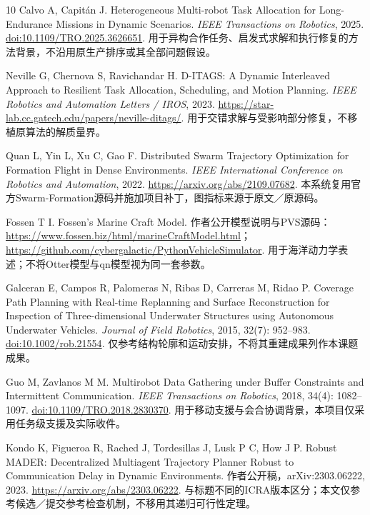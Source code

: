 \documentclass[UTF8,fontset=fandol,a4paper,11pt]{ctexart}
\begin{document}
\begingroup
\linespread{1.02}\selectfont
\setlength{\parskip}{0pt}
\begin{thebibliography}{10}
\small
\setlength{\itemsep}{3pt}
Calvo A, Capitán J.
Heterogeneous Multi-robot Task Allocation for Long-Endurance Missions in Dynamic Scenarios.
\textit{IEEE Transactions on Robotics}, 2025.
\href{https://doi.org/10.1109/TRO.2025.3626651}{doi:10.1109/TRO.2025.3626651}.
用于异构合作任务、启发式求解和执行修复的方法背景，不沿用原生产排序或其全部问题假设。

Neville G, Chernova S, Ravichandar H.
D-ITAGS: A Dynamic Interleaved Approach to Resilient Task Allocation, Scheduling, and Motion Planning.
\textit{IEEE Robotics and Automation Letters / IROS}, 2023.
\url{https://star-lab.cc.gatech.edu/papers/neville-ditags/}.
用于交错求解与受影响部分修复，不移植原算法的解质量界。

Quan L, Yin L, Xu C, Gao F.
Distributed Swarm Trajectory Optimization for Formation Flight in Dense Environments.
\textit{IEEE International Conference on Robotics and Automation}, 2022.
\url{https://arxiv.org/abs/2109.07682}.
本系统复用官方Swarm-Formation源码并施加项目补丁，图指标来源于原文／原源码。

Fossen T I. Fossen's Marine Craft Model.
作者公开模型说明与PVS源码：
\url{https://www.fossen.biz/html/marineCraftModel.html}；
\url{https://github.com/cybergalactic/PythonVehicleSimulator}.
用于海洋动力学表述；不将Otter模型与qn模型视为同一套参数。

Galceran E, Campos R, Palomeras N, Ribas D, Carreras M, Ridao P.
Coverage Path Planning with Real-time Replanning and Surface Reconstruction for Inspection of Three-dimensional Underwater Structures using Autonomous Underwater Vehicles.
\textit{Journal of Field Robotics}, 2015, 32(7): 952--983.
\href{https://doi.org/10.1002/rob.21554}{doi:10.1002/rob.21554}.
仅参考结构轮廓和运动安排，不将其重建成果列作本课题成果。

Guo M, Zavlanos M M.
Multirobot Data Gathering under Buffer Constraints and Intermittent Communication.
\textit{IEEE Transactions on Robotics}, 2018, 34(4): 1082--1097.
\href{https://doi.org/10.1109/TRO.2018.2830370}{doi:10.1109/TRO.2018.2830370}.
用于移动支援与会合协调背景，本项目仅采用任务级支援及实际收件。

Kondo K, Figueroa R, Rached J, Tordesillas J, Lusk P C, How J P.
Robust MADER: Decentralized Multiagent Trajectory Planner Robust to Communication Delay in Dynamic Environments.
作者公开稿，arXiv:2303.06222, 2023.
\url{https://arxiv.org/abs/2303.06222}.
与标题不同的ICRA版本区分；本文仅参考候选／提交参考检查机制，不移用其递归可行性定理。


\end{thebibliography}
\end{document}
